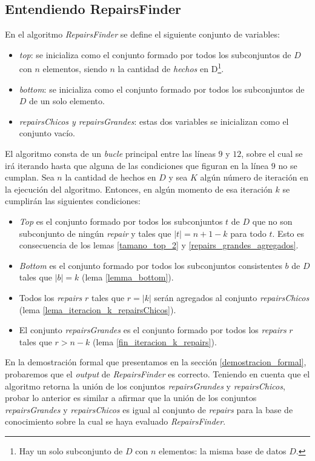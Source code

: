 \documentclass[11pt,a4paper,twoside]{tesis}
\begin{document}
\subsection{Entendiendo RepairsFinder}

En el algoritmo \textit{RepairsFinder} se define el siguiente conjunto de variables:
\begin{itemize}
    \item \textit{top}: se inicializa como el conjunto formado por todos los subconjuntos de $D$ con $n$ elementos, siendo $n$ la cantidad de \textit{hechos} en D\footnote{Hay un solo subconjunto de $D$ con $n$ elementos: la misma base de datos $D$.}.
    \item \textit{bottom}: se inicializa como el conjunto formado por todos los subconjuntos de $D$ de un solo elemento.
    \item \textit{repairsChicos y repairsGrandes}: estas dos variables se inicializan como el conjunto vacío.
\end{itemize}

El algoritmo consta de un \textit{bucle} principal entre las líneas $9$ y $12$, sobre el cual se irá iterando hasta que alguna de las condiciones que figuran en la línea $9$ no se cumplan. Sea $n$ la cantidad de hechos en $D$ y sea $K$ algún número de iteración en la ejecución del algoritmo. Entonces, en algún momento de esa iteración $k$ se cumplirán las siguientes condiciones: 

\begin{itemize}
    \item \textit{Top} es el conjunto formado por todos los subconjuntos $t$ de $D$ que no son subconjunto de ningún \textit{repair} y tales que $|t| = n + 1 - k$ para todo $t$. Esto es consecuencia de los lemas \ref{tamano_top_2} y \ref{repairs_grandes_agregados}.
    \item \textit{Bottom} es el conjunto formado por todos los subconjuntos consistentes $b$ de $D$ tales que  $|b| = k$ (lema \ref{lemma_bottom}).
    \item Todos los \textit{repairs} $r$ tales que $r = |k|$ serán agregados al conjunto \textit{repairsChicos} (lema \ref{lema_iteracion_k_repairsChicos}).
    \item El conjunto \textit{repairsGrandes} es el conjunto formado por todos los \textit{repairs} $r$ tales que $r > n - k$ (lema \ref{fin_iteracion_k_repairs}).
\end{itemize}

En la demostración formal que presentamos en la sección \ref{demostracion_formal}, probaremos que el \textit{output} de \textit{RepairsFinder} es correcto. Teniendo en cuenta que el algoritmo retorna la unión de los conjuntos \textit{repairsGrandes} y \textit{repairsChicos}, probar lo anterior es similar a afirmar que la unión de los conjuntos \textit{repairsGrandes} y \textit{repairsChicos} es igual al conjunto de \textit{repairs} para la base de conocimiento sobre la cual se haya evaluado \textit{RepairsFinder}.
\end{document}
